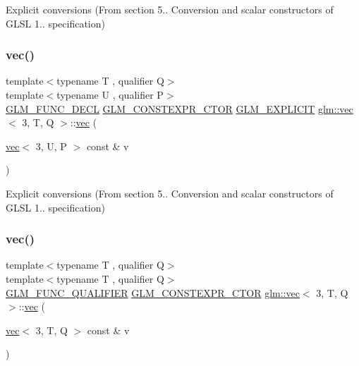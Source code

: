 Explicit conversions (From section 5.. Conversion and scalar constructors of G\+L\+SL 1.. specification) 

\mbox{\label{structglm_1_1vec_3_013_00_01_t_00_01_q_01_4_a47d23576cd135fb6f6b964ed9d4e3599}} 
\subsubsection{\texorpdfstring{vec()}{vec()}\hspace{0.1cm}{\footnotesize\ttfamily [13/23]}}
{\footnotesize\ttfamily template$<$typename T , qualifier Q$>$ \\
template$<$typename U , qualifier P$>$ \\
\mbox{\hyperlink{setup_8hpp_ab2d052de21a70539923e9bcbf6e83a51}{G\+L\+M\+\_\+\+F\+U\+N\+C\+\_\+\+D\+E\+CL}} \mbox{\hyperlink{setup_8hpp_ad34178a09666081abdb573c14d1f4a5a}{G\+L\+M\+\_\+\+C\+O\+N\+S\+T\+E\+X\+P\+R\+\_\+\+C\+T\+OR}} \mbox{\hyperlink{setup_8hpp_a6c74f5a5e7b134ab69023ff9a30d4d5d}{G\+L\+M\+\_\+\+E\+X\+P\+L\+I\+C\+IT}} \mbox{\hyperlink{structglm_1_1vec}{glm\+::vec}}$<$ 3, T, Q $>$\+::\mbox{\hyperlink{structglm_1_1vec}{vec}} (\begin{DoxyParamCaption}\item[{\mbox{\hyperlink{structglm_1_1vec}{vec}}$<$ 3, U, P $>$ const \&}]{v }\end{DoxyParamCaption})}



Explicit conversions (From section 5.. Conversion and scalar constructors of G\+L\+SL 1.. specification) 

\mbox{\label{structglm_1_1vec_3_013_00_01_t_00_01_q_01_4_a9403cc63719b575a9a136e9de99593e4}} 
\subsubsection{\texorpdfstring{vec()}{vec()}\hspace{0.1cm}{\footnotesize\ttfamily [14/23]}}
{\footnotesize\ttfamily template$<$typename T , qualifier Q$>$ \\
template$<$typename T , qualifier Q$>$ \\
\mbox{\hyperlink{setup_8hpp_a33fdea6f91c5f834105f7415e2a64407}{G\+L\+M\+\_\+\+F\+U\+N\+C\+\_\+\+Q\+U\+A\+L\+I\+F\+I\+ER}} \mbox{\hyperlink{setup_8hpp_ad34178a09666081abdb573c14d1f4a5a}{G\+L\+M\+\_\+\+C\+O\+N\+S\+T\+E\+X\+P\+R\+\_\+\+C\+T\+OR}} \mbox{\hyperlink{structglm_1_1vec}{glm\+::vec}}$<$ 3, T, Q $>$\+::\mbox{\hyperlink{structglm_1_1vec}{vec}} (\begin{DoxyParamCaption}\item[{\mbox{\hyperlink{structglm_1_1vec}{vec}}$<$ 3, T, Q $>$ const \&}]{v }\end{DoxyParamCaption})}



